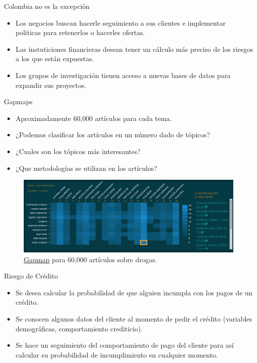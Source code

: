 \documentclass[11pt,usenames, dvipsnames]{beamer}
\begin{document}
\begin{frame}{Colombia no es la excepción}
    \begin{itemize}
        \item Los negocios buscan hacerle seguimiento a sus clientes e implementar politicas para retenerlos o hacerles ofertas.
        \item Las instuticiones financieras desean tener un cálculo más preciso de los riesgos a los que están expuestas.
        \item Los grupos de investigación tienen acceso a nuevas bases de datos para expandir sus proyectos.
    \end{itemize}
\end{frame}

\begin{frame}{Gapmaps}
    \begin{itemize}
        \item Aproximadamente 60,000 artículos para cada tema.
        \item ¿Podemos clasificar los artículos en un número dado de tópicos?
        \item ¿Cuales son los tópicos más interesantes?
        \item ¿Que metodologías se utilizan en los artículos?
    \end{itemize}
        \begin{figure}
        \includegraphics[width=\textwidth]{figures/gapmap}
        \caption{\href{http://seixas.quantil.co/api/site/}{Gapmap} para 60,000 artículos sobre drogas.} 
    \end{figure}
\end{frame}

\begin{frame}{Riesgo de Crédito}
    \begin{itemize}
        \item Se desea calcular la probabilidad de que alguien incumpla con los pagos de un crédito.
        \item Se conocen algunos datos del cliente al momento de pedir el crédito (variables demográficas, comportamiento crediticio). 
        \item Se hace un seguimiento del comportamiento de pago del cliente para así calcular su probabilidad de incumplimiento en cualquier momento.
    \end{itemize}
\end{frame}
\end{document}
